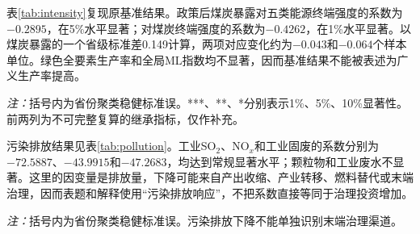 \documentclass[UTF8,12pt]{ctexart}
\newcommand{\note}[1]{\begin{minipage}{0.96\textwidth}\footnotesize\textit{注：}#1\end{minipage}}
\begin{document}
表\ref{tab:intensity}复现原基准结果。政策后煤炭暴露对五类能源终端强度的系数为$-0.2895$，在5\%水平显著；对煤炭终端强度的系数为$-0.4262$，在1\%水平显著。以煤炭暴露的一个省级标准差0.149计算，两项对应变化约为$-0.043$和$-0.064$个样本单位。绿色全要素生产率和全局ML指数均不显著，因而基准结果不能被表述为广义生产率提高。

\begin{table}[H]
\centering
\caption{政策后煤炭暴露与能源强度}
\label{tab:intensity}
\note{括号内为省份聚类稳健标准误。***、**、*分别表示1\%、5\%、10\%显著性。前两列为不可完整复算的继承指标，仅作补充。}
\end{table}

污染排放结果见表\ref{tab:pollution}。工业SO$_2$、NO$_x$和工业固废的系数分别为$-72.5887$、$-43.9915$和$-47.2683$，均达到常规显著水平；颗粒物和工业废水不显著。这里的因变量是排放量，下降可能来自产出收缩、产业转移、燃料替代或末端治理，因而表题和解释使用“污染排放响应”，不把系数直接等同于治理投资增加。

\begin{table}[H]
\centering
\caption{政策后煤炭暴露与污染排放响应}
\label{tab:pollution}
\note{括号内为省份聚类稳健标准误。污染排放下降不能单独识别末端治理渠道。}
\end{table}
\end{document}
